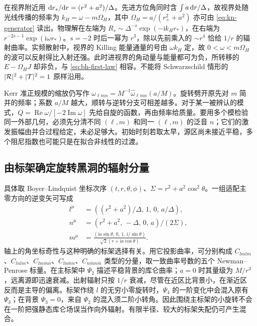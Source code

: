在视界附近用 $\dd r_*/\dd r=(r^2+a^2)/\Delta$。先进方位角同时含 $\int a\,\dd r/\Delta$，故视界处随光线传播的频率为 $k_H=\omega-m\Omega_H$，其中 $\Omega_H=a/(r_+^2+a^2)$ 亦可由 \eqref{eq:kn-generator} 读出。物理解在左端为 $R_s\sim\Delta^{-s}\exp(-\mathrm i k_H r_*)$，在右端为 $r^{-2s-1}\exp(\mathrm i\omega r_*)$。$s=-2$ 时后一幂为 $r^3$，除以先前乘入的 $\sim r^4$ 恰给 $1/r$ 的辐射曲率。实频散射中，视界的 Killing 能量通量的号由 $\omega k_H$ 定，故 $0<\omega<m\Omega_H$ 的波可以反射得比入射还强。此时进视界的角动量与能量都可为负，所转移的 $E-\Omega_HJ$ 却非负，与 \eqref{eq:bh-first-law} 相容。不能将 Schwarzschild 情形的 $|{\cal R}|^2+|{\cal T}|^2=1$ 原样沿用。

Kerr 准正规模的缩放仍写作 $\omega_{\ell mn}=M^{-1}\hat\omega_{\ell mn}(a/M)$。旋转劈开原先对 $m$ 简并的频率；系数 $a/M$ 越大，顺转与逆转分支可相差越多。对于某一被辨认的模式，$Q=\operatorname{Re}\omega/[-2\operatorname{Im}\omega]$ 先给自旋的函数，再由频率给质量。要用多个模检验同一外部几何，必须先分清不同 $(\ell,m)$ 和同一 $(\ell,m)$ 的泛音 $n$；它们的激发振幅由并合过程给定，未必足够大。初始时刻若取太早，源区尚未接近平稳，多个阻尼指数也可能只是在拟合非线性的过渡。

\subsection{由标架确定旋转黑洞的辐射分量}

具体取 Boyer--Lindquist 坐标次序 $(t,r,\theta,\phi)$、$\Sigma=r^2+a^2\cos^2\theta$。一组适配主零方向的逆变矢可写成
\begin{align*}
 l^\mu&=\left((r^2+a^2)/\Delta,\,1,\,0,\,a/\Delta\right),\\
 n^\mu&=\left(r^2+a^2,\,-\Delta,\,0,\,a\right)/(2\Sigma),\\
 m^\mu&=\frac{(\mathrm i a\sin\theta,\,0,\,1,\,\mathrm i/\sin\theta)}
                      {\sqrt2(r+\mathrm i a\cos\theta)}.
\end{align*}
轴上的角坐标奇性与这种明确的标架选择有关。用它投影曲率，可分别构成 $C_{lmlm}$、$C_{lnlm}$、$C_{lm\bar mn}$、$C_{ln\bar mn}$、$C_{n\bar mn\bar m}$ 类型的分量，取一致曲率号数的五个 Newman--Penrose 标量。在主标架中 $\Psi_2$ 描述平稳背景的库仑曲率；$a=0$ 时其量级为 $M/r^3$，远离源即迅速衰减。出射辐射只按 $1/r$ 衰减，尽管在近区比背景小，在渐近区反而是主导的偏离。标架作绕 $l$ 的无穷小零旋转时，$\Psi_4$ 的一阶变化中会混入原有 $\Psi_3$；在背景 $\Psi_3=0$，来自 $\Psi_2$ 的混入须二阶小转角。因此围绕主标架的小旋转不会在一阶把强静态库仑场误当作向外辐射。有限半径、较大的标架失配仍可产生混合。

